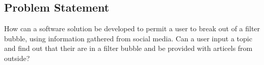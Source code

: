 \subsection*{Problem Statement}
How can a software solution be developed to permit a user to break out of a
filter bubble, using information gathered from social media.
Can a user input a topic and find out that their are in a filter bubble and be
provided with articels from outside?